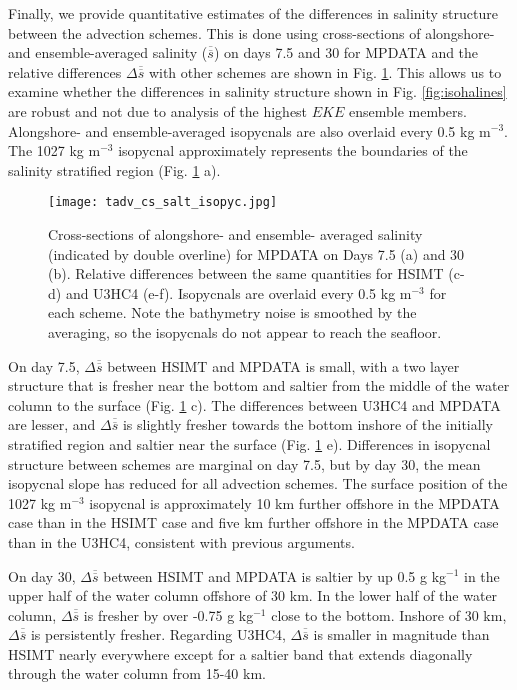 \documentclass[draft]{agujournal2019}
\begin{document}
Finally, we provide quantitative estimates of the differences in salinity structure between the advection schemes. This is done using cross-sections of alongshore- and ensemble-averaged salinity ($\overline{\overline{s}}$) on days 7.5 and 30 for MPDATA and the relative differences $\Delta \overline{\overline{s}}$ with other schemes are shown in Fig. \ref{fig:cs_salt}. This allows us to examine whether the differences in salinity structure shown in Fig. \ref{fig:isohalines} are robust and not due to analysis of the highest $EKE$ ensemble members. Alongshore- and ensemble-averaged isopycnals are also overlaid every 0.5 kg m$^{-3}$. The 1027 kg m$^{-3}$ isopycnal approximately represents the boundaries of the salinity stratified region (Fig. \ref{fig:cs_salt} a).

\begin{figure}[t]
    \begin{center}
    \texttt{[image: tadv\_cs\_salt\_isopyc.jpg]}\\
    \caption{Cross-sections of alongshore- and ensemble- averaged salinity (indicated by double overline) for MPDATA on Days 7.5 (a) and 30 (b). Relative differences between the same quantities for HSIMT (c-d) and U3HC4 (e-f). Isopycnals are overlaid every 0.5 kg m$^{-3}$ for each scheme. Note the bathymetry noise is smoothed by the averaging, so the isopycnals do not appear to reach the seafloor.} \label{fig:cs_salt}
     \end{center} 
\end{figure}

On day 7.5, $\Delta \overline{\overline{s}}$ between HSIMT and MPDATA is small, with a two layer structure that is fresher near the bottom and saltier from the middle of the water column to the surface (Fig. \ref{fig:cs_salt} c).  The differences between U3HC4 and MPDATA are lesser, and $\Delta \overline{\overline{s}}$ is slightly fresher towards the bottom inshore of the initially stratified region and saltier near the surface (Fig. \ref{fig:cs_salt} e). Differences in isopycnal structure between schemes are marginal on day 7.5, but by day 30, the mean isopycnal slope has reduced for all advection schemes. The surface position of the 1027 kg m$^{-3}$ isopycnal is approximately 10 km further offshore in the MPDATA case than in the HSIMT case and five km further offshore in the  MPDATA case than in the U3HC4, consistent with previous arguments. 

On day 30, $\Delta\overline{\overline{s}}$ between HSIMT and MPDATA is saltier by up 0.5 g kg$^{-1}$ in the upper half of the water column offshore of 30 km. In the lower half of the water column, $\Delta\overline{\overline{s}}$ is fresher by over -0.75 g kg$^{-1}$ close to the bottom. Inshore of 30 km, $\Delta \overline{\overline{s}}$ is persistently fresher. Regarding U3HC4, $\Delta \overline{\overline{s}}$ is smaller in magnitude than HSIMT nearly everywhere except for a saltier band that extends diagonally through the water column from 15-40 km.
\end{document}
